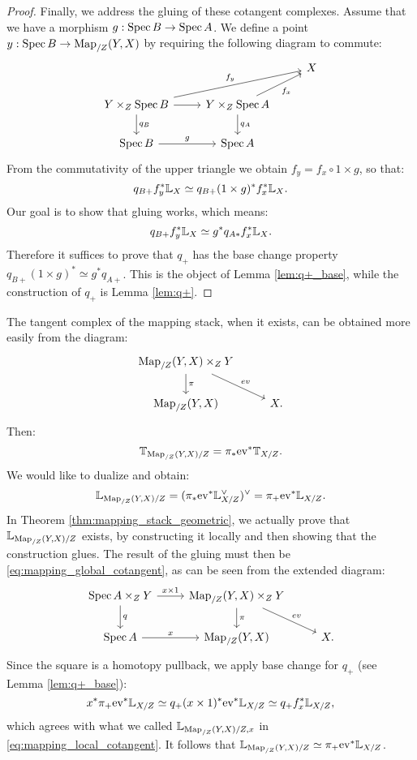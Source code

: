 \begin{proof}
Finally, we address the gluing of these cotangent complexes. Assume that we have a morphism $g: \operatorname{Spec} B \to \operatorname{Spec} A$. We define
a point $y: \operatorname{Spec} B \to \operatorname{Map}_{/Z}(Y,X)$ by requiring the following diagram to commute:
\[
\begin{tikzcd}
\; & & X \\
Y \times_Z \Spec B \arrow{r} \arrow{d}{q_B} \arrow{urr}{f_y} & Y\times_Z \Spec A \arrow{d}{q_A}\arrow[swap]{ur}{f_x} & \\
\Spec B\arrow{r}{g} & \Spec A &
\end{tikzcd}
\]
From the commutativity of the upper triangle we obtain $f_y = f_x \circ 1\times g$, so that:
\[	q_{B+} f_y^* \mathbb L_X \simeq q_{B+}(1\times g)^*f_x^*\mathbb L_X .	\]
Our goal is to show that gluing works, which means:
\[	q_{B+} f_y^* \mathbb L_X \simeq g^* q_{A*} f_x^* \mathbb L_X.	\]
Therefore it suffices to prove that $q_+$ has the base change property $q_{B+}(1\times g)^* \simeq g^* q_{A+}$. This
is the object of Lemma \ref{lem:q+_base}, while the construction of $q_+$ is Lemma \ref{lem:q+}.
\end{proof}

\begin{rem}
\label{rem:mapping_global_cotangent}
The tangent complex of the mapping stack, when it exists, can be obtained more easily from the diagram:
\[
\begin{tikzcd}
\Map_{/Z}(Y,X) \times_Z Y \arrow{d}{\pi}\arrow{dr}{ev} & \\ \Map_{/Z}(Y,X) & X.
\end{tikzcd}
\]
Then:
\[	\mathbb T_{\operatorname{Map}_{/Z}(Y,X)/Z} = \pi_* \mathrm{ev}^* \mathbb T_{X/Z}.	\]
We would like to dualize and obtain:
\begin{equation}
\label{eq:mapping_global_cotangent}
	\mathbb L_{\operatorname{Map}_{/Z}(Y,X)/Z} = (\pi_* \mathrm{ev}^* \mathbb L_{X/Z}^{\vee})^{\vee} = \pi_+ \mathrm{ev}^* \mathbb L_{X/Z}.
\end{equation}
In Theorem \ref{thm:mapping_stack_geometric}, we actually prove that $\mathbb L_{\operatorname{Map}_{/Z}(Y,X)/Z}$ exists, by constructing
it locally and then showing that the construction glues. The result of the gluing must then be \ref{eq:mapping_global_cotangent},
as can be seen from the extended diagram:
\[
\begin{tikzcd}
\Spec A \times_Z Y\arrow{r}{x\times 1}\arrow{d}{q} &\Map_{/Z}(Y,X) \times_Z Y \arrow{d}{\pi}\arrow{dr}{ev} & \\
\Spec A\arrow{r}{x} & \Map_{/Z}(Y,X) & X.
\end{tikzcd}
\]
Since the square is a homotopy pullback, we apply base change for $q_+$ (see Lemma \ref{lem:q+_base}):
\[	x^* \pi_+ \mathrm{ev}^* \mathbb L_{X/Z} \simeq q_+ (x\times 1)^* \mathrm{ev}^* \mathbb L_{X/Z} \simeq q_+ f_x^*\mathbb L_{X/Z},	\]
which agrees with what we called $\mathbb L_{\operatorname{Map}_{/Z}(Y,X)/Z,x}$ in \ref{eq:mapping_local_cotangent}. It follows that
$\mathbb L_{\operatorname{Map}_{/Z}(Y,X)/Z} \simeq \pi_+ \mathrm{ev}^* \mathbb L_{X/Z}$.
\end{rem}



